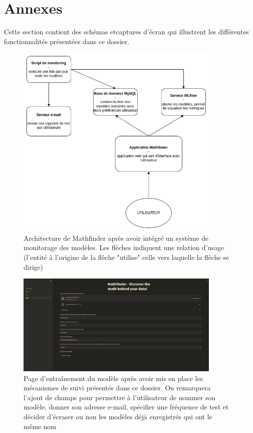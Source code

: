 \documentclass[french]{article}
\begin{document}
    \section{Annexes}
    \label{sec:annexes}
    Cette section contient des schémas etcaptures d'écran qui illustrent les différentes fonctionnalités présentées dans ce dossier.
    \begin{figure}[h!]
        \includegraphics[width=10cm]{monitoring_E5}
        \centering
        \caption{Architecture de Mathfinder après avoir intégré un système de monitorage des modèles. Les flèches indiquent une relation d'usage (l'entité à l'origine de la flèche "utilise" celle vers laquelle la flèche se dirige)}
        \centering
        \label{fig:architecture}
    \end{figure}
    \begin{figure}[h!]
        \includegraphics[width=10cm]{appli_2}
        \centering
        \caption{Page d'entraînement du modèle après avoir mis en place les mécanismes de suivi présentés dans ce dossier. On remarquera l'ajout de champs pour permettre à l'utilisateur de nommer son modèle, donner son adresse e-mail, spécifier une fréquence de test et décider d'écraser ou non les modèles déjà enregistrés qui ont le même nom}
        \centering
    \end{figure}
\end{document}
